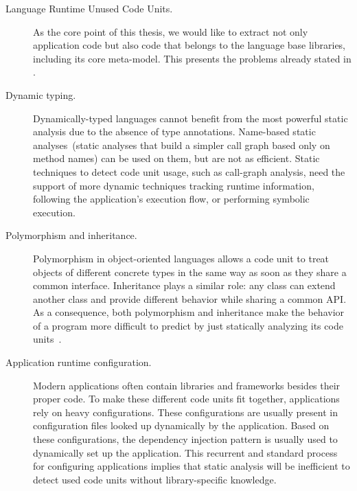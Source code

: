 \begin{description}

\item[Language Runtime Unused Code Units.] As the core point of this thesis, we would like to extract not only application code but also code that belongs to the language base libraries, including its core meta-model. This presents the problems already stated in .

\item[Dynamic typing.] Dynamically-typed languages cannot benefit from the most powerful static analysis due to the absence of type annotations. Name-based static analyses~(static analyses that build a simpler call graph based only on method names) can be used on them, but are not as efficient. Static techniques to detect code unit usage, such as call-graph analysis, need the support of more dynamic techniques \eg tracking runtime information, following the application's execution flow, or performing symbolic execution.

\item[Polymorphism and inheritance.] Polymorphism in object-oriented languages allows a code unit to treat objects of different concrete types in the same way as soon as they share a common interface. Inheritance plays a similar role: any class can extend another class and provide different behavior while sharing a common API.
As a consequence, both polymorphism and inheritance make the behavior of a program more difficult to predict by just statically analyzing its code units~\cite{Taen89a}.

\item[Application runtime configuration.] Modern applications often contain libraries and frameworks besides their proper code. 
To make these different code units fit together, applications rely on heavy configurations. 
These configurations are usually present in configuration files looked up dynamically by the application. 
Based on these configurations, the dependency injection pattern is usually used to dynamically set up the application. 
This recurrent and standard process for configuring applications implies that static analysis will be inefficient to detect used code units without library-specific knowledge.



\end{description}
